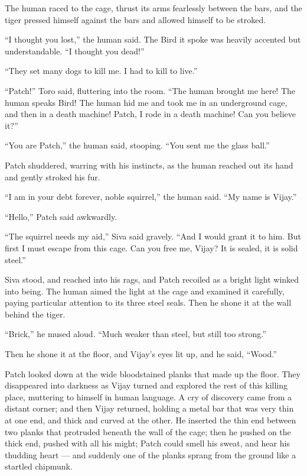 \documentclass[ebook,oneside,openany,17pt]{memoir}
\begin{document}
The human raced to the cage, thrust its arms fearlessly between the
bars, and the tiger pressed himself against the bars and allowed
himself to be stroked.

“I thought you lost,” the human said. The Bird it spoke was heavily
accented but understandable. “I thought you dead!”

“They set many dogs to kill me. I had to kill to live.”

“Patch!” Toro said, fluttering into the room. “The human brought me
here! The human speaks Bird! The human hid me and took me in an
underground cage, and then in a death machine! Patch, I rode in a
death machine! Can you believe it?”

“You are Patch,” the human said, stooping. “You sent me the glass
ball.”

Patch shuddered, warring with his instincts, as the human reached out
its hand and gently stroked his fur.

“I am in your debt forever, noble squirrel,” the human said. “My name
is Vijay.”

“Hello,” Patch said awkwardly.

“The squirrel needs my aid,” Siva said gravely. “And I would grant it
to him. But first I must escape from this cage. Can you free me,
Vijay? It is sealed, it is solid steel.”

Siva stood, and reached into his rags, and Patch recoiled as a bright
light winked into being. The human aimed the light at the cage and
examined it carefully, paying particular attention to its three steel
seals. Then he shone it at the wall behind the tiger.

“Brick,” he mused aloud. “Much weaker than steel, but still too
strong.”

Then he shone it at the floor, and Vijay’s eyes lit up, and he said,
“Wood.”

Patch looked down at the wide bloodstained planks that made up the
floor. They disappeared into darkness as Vijay turned and explored the
rest of this killing place, muttering to himself in human language. A
cry of discovery came from a distant corner; and then Vijay returned,
holding a metal bar that was very thin at one end, and thick and
curved at the other. He inserted the thin end between two planks that
protruded beneath the wall of the cage; then he pushed on the thick
end, pushed with all his might; Patch could smell his sweat, and hear
his thudding heart — and suddenly one of the planks sprang from the
ground like a startled chipmunk.
\end{document}
